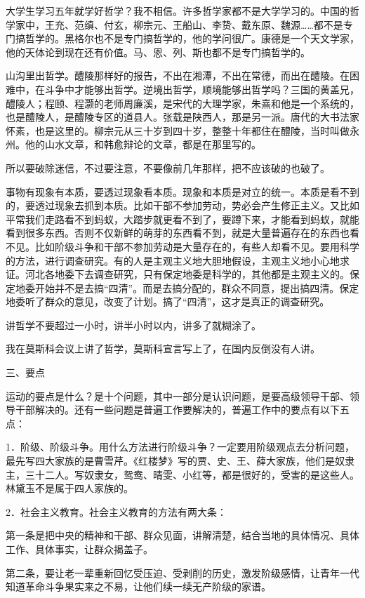大学生学习五年就学好哲学？我不相信。许多哲学家都不是大学学习的。中国的哲学家中，王充、范缜、付玄，柳宗元、王船山、李贽、戴东原、魏源……都不是专门搞哲学的。黑格尔也不是专门搞哲学的，他的学问很广。康德是一个天文学家，他的天体论到现在还有价值。马、恩、列、斯也都不是专门搞哲学的。

山沟里出哲学。醴陵那样好的报告，不出在湘潭，不出在常德，而出在醴陵。在困难中，在斗争中才能够出哲学。逆境出哲学，顺境能够出哲学吗？三国的黄盖兄，醴陵人；程颐、程灏的老师周廉溪，是宋代的大理学家，朱熹和他是一个系统的，也是醴陵人，是醴陵专区的道县人。张载是陕西人，那是另一派。唐代的大书法家怀素，也是这里的。柳宗元从三十岁到四十岁，整整十年都住在醴陵，当时叫做永州。他的山水文章，和韩愈辩论的文章，都是在那里写的。

所以要破除迷信，不过要注意，不要像前几年那样，把不应该破的也破了。

事物有现象有本质，要透过现象看本质。现象和本质是对立的统一。本质是看不到的，要透过现象去抓到本质。比如干部不参加劳动，势必会产生修正主义。又比如平常我们走路看不到蚂蚁，大踏步就更看不到了，要蹲下来，才能看到蚂蚁，就能看到很多东西。否则不仅新鲜的萌芽的东西看不到，就是大量普遍存在的东西也看不见。比如阶级斗争和干部不参加劳动是大量存在的，有些人却看不见。要用科学的方法，进行调查研究。有的人是主观主义地大胆地假设，主观主义地小心地求证。河北各地委下去调查研究，只有保定地委是科学的，其他都是主观主义的。保定地委开始并不是去搞“四清”。而是去搞分配的，群众不同意，提出搞四清。保定地委听了群众的意见，改变了计划。搞了“四清”，这才是真正的调查研究。

讲哲学不要超过一小时，讲半小时以内，讲多了就糊涂了。

我在莫斯科会议上讲了哲学，莫斯科宣言写上了，在国内反倒没有人讲。

三、要点

运动的要点是什么？是十个问题，其中一部分是认识问题，是要高级领导干部、领导干部解决的。还有一些问题是普遍工作要解决的，普遍工作中的要点有以下五点：

1．阶级、阶级斗争。用什么方法进行阶级斗争？一定要用阶级观点去分析问题，最先写四大家族的是曹雪芹。《红楼梦》写的贾、史、王、薛大家族，他们是奴隶主，三十二人。写奴隶女，鸳鸯、晴雯、小红等，都是很好的，受害的是这些人。林黛玉不是属于四人家族的。

2．社会主义教育。社会主义教育的方法有两大条：

第一条是把中央的精神和干部、群众见面，讲解清楚，结合当地的具体情况、具体工作、具体事实，让群众揭盖子。

第二条，要让老一辈重新回忆受压迫、受剥削的历史，激发阶级感情，让青年一代知道革命斗争果实来之不易，让他们续一续无产阶级的家谱。

